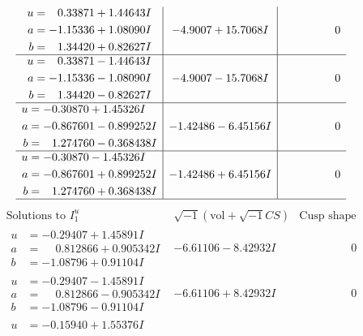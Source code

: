 \documentclass[1p]{elsarticle_modified}
\theoremstyle{definition}
\newcommand{\I}{\sqrt{-1}}
\begin{document}
$$\begin{array}{c|c|c}
\begin{aligned}
u &= \phantom{-}0.33871 + 1.44643 I \\
a &= -1.15336 + 1.08090 I \\
b &= \phantom{-}1.34420 + 0.82627 I\end{aligned}
 & -4.9007 + 15.7068 I & \phantom{-0.000000 } 0 \\ \hline\begin{aligned}
u &= \phantom{-}0.33871 - 1.44643 I \\
a &= -1.15336 - 1.08090 I \\
b &= \phantom{-}1.34420 - 0.82627 I\end{aligned}
 & -4.9007 - 15.7068 I & \phantom{-0.000000 } 0 \\ \hline\begin{aligned}
u &= -0.30870 + 1.45326 I \\
a &= -0.867601 - 0.899252 I \\
b &= \phantom{-}1.274760 - 0.368438 I\end{aligned}
 & -1.42486 - 6.45156 I & \phantom{-0.000000 } 0 \\ \hline\begin{aligned}
u &= -0.30870 - 1.45326 I \\
a &= -0.867601 + 0.899252 I \\
b &= \phantom{-}1.274760 + 0.368438 I\end{aligned}
 & -1.42486 + 6.45156 I & \phantom{-0.000000 } 0\\
 \hline 
 \end{array}$$\newpage$$\begin{array}{c|c|c}  
\text{Solutions to }I^u_{1}& \I (\text{vol} + \sqrt{-1}CS) & \text{Cusp shape}\\
 \hline 
\begin{aligned}
u &= -0.29407 + 1.45891 I \\
a &= \phantom{-}0.812866 + 0.905342 I \\
b &= -1.08796 + 0.91104 I\end{aligned}
 & -6.61106 - 8.42932 I & \phantom{-0.000000 } 0 \\ \hline\begin{aligned}
u &= -0.29407 - 1.45891 I \\
a &= \phantom{-}0.812866 - 0.905342 I \\
b &= -1.08796 - 0.91104 I\end{aligned}
 & -6.61106 + 8.42932 I & \phantom{-0.000000 } 0 \\ \hline\begin{aligned}
u &= -0.15940 + 1.55376 I \\

\end{aligned}
\end{array}$$
\end{document}
